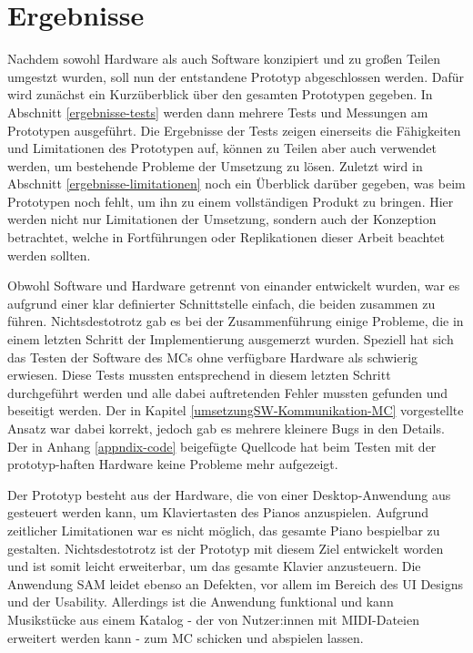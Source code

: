 

\chapter{Ergebnisse} \label{ergebnisse}

Nachdem sowohl Hardware als auch Software konzipiert und zu großen Teilen umgestzt wurden, soll nun der entstandene Prototyp abgeschlossen werden.
Dafür wird zunächst ein Kurzüberblick über den gesamten Prototypen gegeben.
In Abschnitt \ref{ergebnisse-tests} werden dann mehrere Tests und Messungen am Prototypen ausgeführt.
Die Ergebnisse der Tests zeigen einerseits die Fähigkeiten und Limitationen des Prototypen auf, können zu Teilen aber auch verwendet werden, um bestehende Probleme der Umsetzung zu lösen.
Zuletzt wird in Abschnitt \ref{ergebnisse-limitationen} noch ein Überblick darüber gegeben, was beim Prototypen noch fehlt, um ihn zu einem vollständigen Produkt zu bringen.
Hier werden nicht nur Limitationen der Umsetzung, sondern auch der Konzeption betrachtet, welche in Fortführungen oder Replikationen dieser Arbeit beachtet werden sollten.

Obwohl Software und Hardware getrennt von einander entwickelt wurden, war es aufgrund einer klar definierter Schnittstelle einfach, die beiden zusammen zu führen.
Nichtsdestotrotz gab es bei der Zusammenführung einige Probleme, die in einem letzten Schritt der Implementierung ausgemerzt wurden.
Speziell hat sich das Testen der Software des \ac{MC}s ohne verfügbare Hardware als schwierig erwiesen.
Diese Tests mussten entsprechend in diesem letzten Schritt durchgeführt werden und alle dabei auftretenden Fehler mussten gefunden und beseitigt werden.
Der in Kapitel \ref{umsetzungSW-Kommunikation-MC} vorgestellte Ansatz war dabei korrekt, jedoch gab es mehrere kleinere Bugs in den Details.
Der in Anhang \ref{appndix-code} beigefügte Quellcode hat beim Testen mit der prototyp-haften Hardware keine Probleme mehr aufgezeigt.

Der Prototyp besteht aus der Hardware, die von einer Desktop-Anwendung aus gesteuert werden kann, um Klaviertasten des Pianos anzuspielen.
Aufgrund zeitlicher Limitationen war es nicht möglich, das gesamte Piano bespielbar zu gestalten.
Nichtsdestotrotz ist der Prototyp mit diesem Ziel entwickelt worden und ist somit leicht erweiterbar, um das gesamte Klavier anzusteuern.
Die Anwendung \ac{SAM} leidet ebenso an Defekten, vor allem im Bereich des \ac{UI} Designs und der Usability.
Allerdings ist die Anwendung funktional und kann Musikstücke aus einem Katalog - der von Nutzer:innen mit \ac{MIDI}-Dateien erweitert werden kann - zum \ac{MC} schicken und abspielen lassen.



